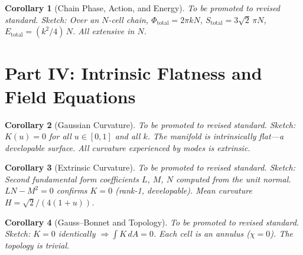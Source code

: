 \documentclass[12pt]{amsart}
\newtheorem{corollary}{Corollary}
\begin{document}
\begin{corollary}[Chain Phase, Action, and Energy]
To be promoted to revised standard. \textit{Sketch:} Over an $N$-cell chain,
$\Phi_{\mathrm{total}} = 2\pi k N$, $S_{\mathrm{total}} = 3\sqrt{2}\,\pi N$,
$E_{\mathrm{total}} = (k^2/4)\, N$. All extensive in $N$.
\end{corollary}


\section*{Part IV: Intrinsic Flatness and Field Equations}

\begin{corollary}[Gaussian Curvature]
To be promoted to revised standard. \textit{Sketch:} $K(u) = 0$ for all $u \in [0,1]$ and
all $k$. The manifold is intrinsically flat---a developable surface. All curvature experienced
by modes is extrinsic.
\end{corollary}

\begin{corollary}[Extrinsic Curvature]
To be promoted to revised standard. \textit{Sketch:} Second fundamental form coefficients
$L$, $M$, $N$ computed from the unit normal. $LN - M^2 = 0$ confirms $K = 0$ (rank-1,
developable). Mean curvature $H = \sqrt{2}/(4(1+u))$.
\end{corollary}

\begin{corollary}[Gauss--Bonnet and Topology]
To be promoted to revised standard. \textit{Sketch:} $K = 0$ identically
$\Rightarrow \int K\, dA = 0$. Each cell is an annulus ($\chi = 0$). The topology is trivial.
\end{corollary}
\end{document}
